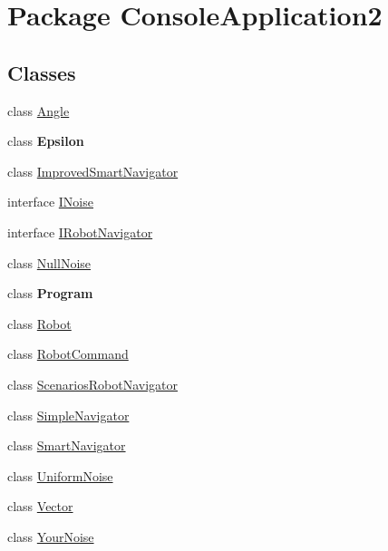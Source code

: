 \hypertarget{namespace_console_application2}{}\section{Package Console\+Application2}
\label{namespace_console_application2}
\subsection*{Classes}
\begin{DoxyCompactItemize}
\item 
class \hyperlink{class_console_application2_1_1_angle}{Angle}
\item 
class {\bfseries Epsilon}
\item 
class \hyperlink{class_console_application2_1_1_improved_smart_navigator}{Improved\+Smart\+Navigator}
\item 
interface \hyperlink{interface_console_application2_1_1_i_noise}{I\+Noise}
\item 
interface \hyperlink{interface_console_application2_1_1_i_robot_navigator}{I\+Robot\+Navigator}
\item 
class \hyperlink{class_console_application2_1_1_null_noise}{Null\+Noise}
\item 
class {\bfseries Program}
\item 
class \hyperlink{class_console_application2_1_1_robot}{Robot}
\item 
class \hyperlink{class_console_application2_1_1_robot_command}{Robot\+Command}
\item 
class \hyperlink{class_console_application2_1_1_scenarios_robot_navigator}{Scenarios\+Robot\+Navigator}
\item 
class \hyperlink{class_console_application2_1_1_simple_navigator}{Simple\+Navigator}
\item 
class \hyperlink{class_console_application2_1_1_smart_navigator}{Smart\+Navigator}
\item 
class \hyperlink{class_console_application2_1_1_uniform_noise}{Uniform\+Noise}
\item 
class \hyperlink{class_console_application2_1_1_vector}{Vector}
\item 
class \hyperlink{class_console_application2_1_1_your_noise}{Your\+Noise}
\end{DoxyCompactItemize}
